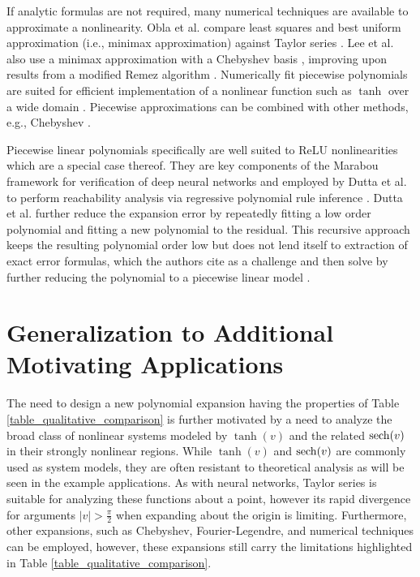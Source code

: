 If analytic formulas are not required, many numerical techniques are available to approximate a nonlinearity.  Obla et al. compare least squares and best uniform approximation (i.e., minimax approximation) against Taylor series \cite{obla_effective_2020}. Lee et al. also use a minimax approximation with a Chebyshev basis \cite{lee_near-optimal_2020}, improving upon results from a modified Remez algorithm \cite{lee_high-precision_2020}. Numerically fit piecewise polynomials are suited for efficient implementation of a nonlinear function such as $\tanh$ over a wide domain \cite{namin_efficient_2009,armato_low-error_2011}.  Piecewise approximations can be combined with other methods, e.g., Chebyshev \cite{baptista_low-resource_2013}.

Piecewise linear polynomials specifically are well suited to ReLU nonlinearities which are a special case thereof. They are key components of the Marabou framework for verification of deep neural networks \cite{katz_marabou_2019} and employed by Dutta et al. to perform reachability analysis via regressive polynomial rule inference \cite{dutta_reachability_2019}.  Dutta et al. further reduce the expansion error by repeatedly fitting a low order polynomial and fitting a new polynomial to the residual. This recursive approach keeps the resulting polynomial order low but does not lend itself to extraction of exact error formulas, which the authors cite as a challenge and then solve by further reducing the polynomial to a piecewise linear model \cite{dutta_reachability_2019}.

\section{Generalization to Additional Motivating Applications}

The need to design a new polynomial expansion having the properties of Table \ref{table_qualitative_comparison} is further motivated by a need to analyze the broad class of nonlinear systems modeled by $\tanh(v)$ and the related $\operatorname{sech}(v)$ in their strongly nonlinear regions.  While $\tanh(v)$ and $\operatorname{sech}(v)$ are commonly used as system models, they are often resistant to theoretical analysis as will be seen in the example applications.  As with neural networks, Taylor series is suitable for analyzing these functions about a point, however its rapid divergence for arguments $|v| > \frac{\pi}{2}$ when expanding about the origin is limiting.  Furthermore, other expansions, such as Chebyshev, Fourier-Legendre, and numerical techniques can be employed, however, these expansions still carry the limitations highlighted in Table \ref{table_qualitative_comparison}.

